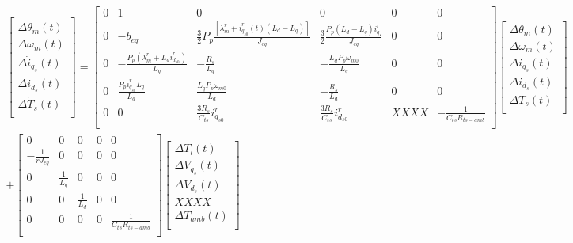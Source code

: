 \documentclass{article}
\begin{document}
\begin{multline}
    \begin{bmatrix}
        \Delta\dot{\theta}_{m}(t)\\
        \Delta\dot{\omega}_{m}(t)\\
        \Delta\dot{i}_{q_{s}}(t)\\
        \Delta\dot{i}_{d_{s}}(t)\\
        \Delta\dot{T}_{s}(t)\\
    \end{bmatrix} =
    \begin{bmatrix}
        0 & 1 & 0 & 0 & 0 & 0 \\
        0 & -b_{eq} & \frac{3}{2}P_{p}\frac{[\lambda_{m}^r + i_{q_{s0}}^r(t)(L_{d}-L_{q})]}{J_{eq}} & \frac{3}{2}\frac{P_{p}(L_{d}-L_{q})i_{q_{s}}^r}{J_{eq}} & 0 & 0\\
        0 & -\frac{P_{p}(\lambda_{m}^r + L_{d}i_{d_{s0}}^r)}{L_{q}} & -\frac{R_{s}}{L_{q}} & -\frac{L_{d}P_{p}\omega_{m0}}{L_{q}} & 0 & 0\\
        0 & \frac{P_{p}i_{q_{s0}}^r L_{q}}{L_{d}} & \frac{L_{q}P_{p}\omega_{m0}}{L_{d}} & -\frac{R_{s}}{L_{d}} & 0 & 0\\
        0 & 0 & \frac{3R_{s}}{C_{ts}}i_{q_{s0}}^r & \frac{3R_{s}}{C_{ts}}i_{d_{s0}}^r & XXXX & -\frac{1}{C_{ts}R_{ts-amb}}\\
    \end{bmatrix}
    \begin{bmatrix}
        \Delta{\theta}_{m}(t)\\
        \Delta{\omega}_{m}(t)\\
        \Delta{i}_{q_{s}}(t)\\
        \Delta{i}_{d_{s}}(t)\\
        \Delta{T}_{s}(t)\\
    \end{bmatrix}\\  + 
    \begin{bmatrix}
        0 & 0 & 0 & 0 & 0\\
        -\frac{1}{rJ_{eq}} & 0 & 0 & 0 & 0\\
        0 & \frac{1}{L_{q}} & 0 & 0 & 0\\
        0 & 0 & \frac{1}{L_{d}} & 0 & 0\\
        0 & 0 & 0 & 0 & \frac{1}{C_{ts}R_{ts-amb}}\\
    \end{bmatrix}
    \begin{bmatrix}
        \Delta{T}_{l}(t)\\
        \Delta{V}_{q_{s}}(t)\\
        \Delta{V}_{d_{s}}(t)\\
        XXXX\\
        \Delta T_{amb}(t)\\
    \end{bmatrix} 
\end{multline}
\end{document}
